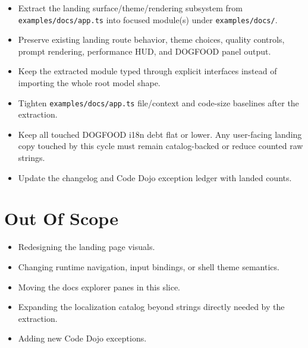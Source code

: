 \begin{itemize}
\tightlist
\item
  Extract the landing surface/theme/rendering subsystem from \texttt{e\allowbreak{}x\allowbreak{}a\allowbreak{}m\allowbreak{}p\allowbreak{}l\allowbreak{}e\allowbreak{}s\allowbreak{}/\allowbreak{}d\allowbreak{}o\allowbreak{}c\allowbreak{}s\allowbreak{}/\allowbreak{}a\allowbreak{}p\allowbreak{}p\allowbreak{}.\allowbreak{}t\allowbreak{}s} into focused module(s) under \texttt{e\allowbreak{}x\allowbreak{}a\allowbreak{}m\allowbreak{}p\allowbreak{}l\allowbreak{}e\allowbreak{}s\allowbreak{}/\allowbreak{}d\allowbreak{}o\allowbreak{}c\allowbreak{}s\allowbreak{}/}.
\item
  Preserve existing landing route behavior, theme choices, quality controls, prompt rendering, performance HUD, and DOGFOOD panel output.
\item
  Keep the extracted module typed through explicit interfaces instead of importing the whole root model shape.
\item
  Tighten \texttt{e\allowbreak{}x\allowbreak{}a\allowbreak{}m\allowbreak{}p\allowbreak{}l\allowbreak{}e\allowbreak{}s\allowbreak{}/\allowbreak{}d\allowbreak{}o\allowbreak{}c\allowbreak{}s\allowbreak{}/\allowbreak{}a\allowbreak{}p\allowbreak{}p\allowbreak{}.\allowbreak{}t\allowbreak{}s} file/context and code-size baselines after the extraction.
\item
  Keep all touched DOGFOOD i18n debt flat or lower. Any user-facing landing copy touched by this cycle must remain catalog-backed or reduce counted raw strings.
\item
  Update the changelog and Code Dojo exception ledger with landed counts.
\end{itemize}

\section{Out Of Scope}\label{record-117-out-of-scope}

\begin{itemize}
\tightlist
\item
  Redesigning the landing page visuals.
\item
  Changing runtime navigation, input bindings, or shell theme semantics.
\item
  Moving the docs explorer panes in this slice.
\item
  Expanding the localization catalog beyond strings directly needed by the extraction.
\item
  Adding new Code Dojo exceptions.
\end{itemize}

